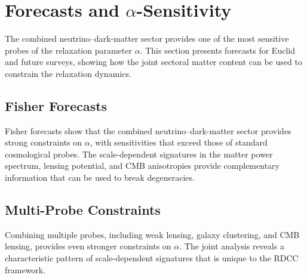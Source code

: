 \documentclass[11pt,a4paper]{article}
\newcommand{\alphaR}{\alpha}
\begin{document}

\section{Forecasts and \texorpdfstring{$\alpha$}{alpha}-Sensitivity}

The combined neutrino–dark-matter sector provides one of the most sensitive
probes of the relaxation parameter $\alphaR$. This section presents forecasts
for Euclid and future surveys, showing how the joint sectoral matter content
can be used to constrain the relaxation dynamics.




\subsection{Fisher Forecasts}

Fisher forecasts show that the combined neutrino–dark-matter sector provides
strong constraints on $\alphaR$, with sensitivities that exceed those of
standard cosmological probes. The scale-dependent signatures in the matter
power spectrum, lensing potential, and CMB anisotropies provide complementary
information that can be used to break degeneracies.




\subsection{Multi-Probe Constraints}

Combining multiple probes, including weak lensing, galaxy clustering, and CMB
lensing, provides even stronger constraints on $\alphaR$. The joint analysis
reveals a characteristic pattern of scale-dependent signatures that is unique
to the RDCC framework.



\end{document}
